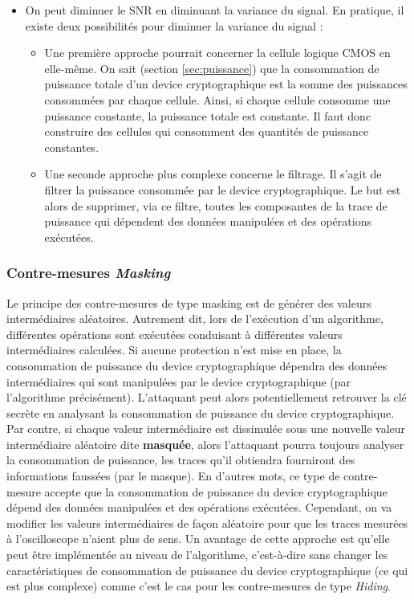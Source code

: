 \documentclass[oneside]{book}
\begin{document}
\begin{itemize}
\begin{itemize}
\item On peut diminuer le SNR en diminuant la variance du signal. En pratique, il existe deux possibilités pour diminuer la variance du signal :
\begin{itemize}
\item Une première approche pourrait concerner la cellule logique CMOS en elle-même. On sait (section \ref{sec:puissance}) que la consommation de puissance totale d'un device cryptographique est la somme des puissances consommées par chaque cellule. Ainsi, si chaque cellule consomme une puissance constante, la puissance totale est constante. Il faut donc construire des cellules qui consomment des quantités de puissance constantes.
\item Une seconde approche plus complexe concerne le filtrage. Il s'agit de filtrer la puissance consommée par le device cryptographique. Le but est alors de supprimer, via ce filtre, toutes les composantes de la trace de puissance qui dépendent des données manipulées et des opérations exécutées. 
\end{itemize}
\end{itemize}
\end{itemize}







\subsubsection{Contre-mesures \textit{Masking}}
Le principe des contre-mesures de type masking est de générer des valeurs intermédiaires aléatoires. Autrement dit, lors de l'exécution d'un algorithme, différentes opérations sont exécutées conduisant à différentes valeurs intermédiaires calculées. Si aucune protection n'est mise en place, la consommation de puissance du device cryptographique dépendra des données intermédiaires qui sont manipulées par le device cryptographique (par l'algorithme précisément). L'attaquant peut alors potentiellement retrouver la clé secrète en analysant la consommation de puissance du device cryptographique. Par contre, si chaque valeur intermédiaire est dissimulée sous une nouvelle valeur intermédiaire aléatoire dite \textbf{masquée}, alors l'attaquant pourra toujours analyser la consommation de puissance, les traces qu'il obtiendra fourniront des informations faussées (par le masque). En d'autres mots, ce type de contre-mesure accepte que la consommation de puissance du device cryptographique dépend des données manipulées et des opérations exécutées. Cependant, on va modifier les valeurs intermédiaires de façon aléatoire pour que les traces mesurées à l'oscilloscope n'aient plus de sens. Un avantage de cette approche est qu'elle peut être implémentée au niveau de l'algorithme, c'est-à-dire sans changer les caractéristiques de consommation de puissance du device cryptographique (ce qui est plus complexe) comme c'est le cas pour les contre-mesures de type \textit{Hiding}.
\end{document}
